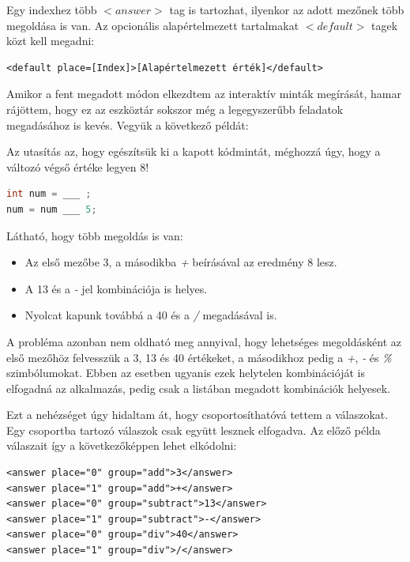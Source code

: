 \documentclass[12pt,a4paper]{article}
\begin{document}
	Egy indexhez több $<answer>$ tag is tartozhat, ilyenkor az adott mezőnek több megoldása is van. Az opcionális alapértelmezett tartalmakat $<default>$ tagek közt kell megadni:
	
	\bigskip %
	\begin{lstlisting}
<default place=[Index]>[Alapértelmezett érték]</default>
	\end{lstlisting}
	\bigskip
	
	Amikor a fent megadott módon elkezdtem az interaktív minták megírását, hamar rájöttem, hogy ez az eszköztár sokszor még a legegyszerűbb feladatok megadásához is kevés. Vegyük a következő példát:
	
	Az utasítás az, hogy egészítsük ki a kapott kódmintát, méghozzá úgy, hogy a változó végső értéke legyen 8!
	
	\bigskip
	\begin{lstlisting}[language=Java]
int num = ___ ;
num = num ___ 5;
	\end{lstlisting}  
	\bigskip
	
	Látható, hogy több megoldás is van:
	
	\begin{itemize}
		\item Az első mezőbe 3, a másodikba \textit{+} beírásával az eredmény 8 lesz.
		\item A 13 és a \textit{-} jel kombinációja is helyes.
		\item Nyolcat kapunk továbbá a 40 és a \textit{/} megadásával is.
	\end{itemize}
	
	A probléma azonban nem oldható meg annyival, hogy lehetséges megoldásként az első mezőhöz felvesszük a 3, 13 és 40 értékeket, a másodikhoz pedig a \textit{+}, \textit{-} és \textit{\%} szimbólumokat. Ebben az esetben ugyanis ezek helytelen kombinációját is elfogadná az alkalmazás, pedig csak a listában megadott kombinációk helyesek.
	
	Ezt a nehézséget úgy hidaltam át, hogy csoportosíthatóvá tettem a válaszokat. Egy csoportba tartozó válaszok csak együtt lesznek elfogadva. Az előző példa válaszait így a következőképpen lehet elkódolni:
	
	\bigskip
	\begin{lstlisting}
<answer place="0" group="add">3</answer>
<answer place="1" group="add">+</answer>
<answer place="0" group="subtract">13</answer>
<answer place="1" group="subtract">-</answer>
<answer place="0" group="div">40</answer>
<answer place="1" group="div">/</answer>
	\end{lstlisting}
	\bigskip
	
\end{document}

